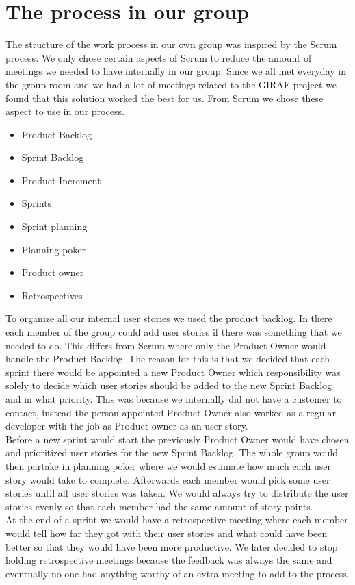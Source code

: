\section{The process in our group}

The structure of the work process in our own group was inspired by the Scrum process.
We only chose certain aspects of Scrum to reduce the amount of meetings we needed to have internally in our group. 
Since we all met everyday in the group room and we had a lot of meetings related to the GIRAF project we found that this solution worked the best for us.
From Scrum we chose these aspect to use in our process.

 \begin{itemize}
    \item Product Backlog
    \item Sprint Backlog
    \item Product Increment
    \item Sprints
    \item Sprint planning
    \item Planning poker
    \item Product owner
    \item Retrospectives
 \end{itemize}

 To organize all our internal user stories we used the product backlog.
 In there each member of the group could add user stories if there was something that we needed to do.
 This differs from Scrum where only the Product Owner would handle the Product Backlog.
 The reason for this is that we decided that each sprint there would be appointed a new Product Owner which responsibility was solely to decide which user stories should be added to the new Sprint Backlog and in what priority.
 This was because we internally did not have a customer to contact, instead the person appointed Product Owner also worked as a regular developer with the job as Product owner as an user story.
 \\
 Before a new sprint would start the previously Product Owner would have chosen and prioritized user stories for the new Sprint Backlog.
 The whole group would then partake in planning poker where we would estimate how much each user story would take to complete.
 Afterwards each member would pick some user stories until all user stories was taken.
 We would always try to distribute the user stories evenly so that each member had the same amount of story points.
 \\
 At the end of a sprint we would have a retrospective meeting where each member would tell how far they got with their user stories and what could have been better so that they would have been more productive.
 We later decided to stop holding retrospective meetings because the feedback was always the same and eventually no one had anything worthy of an extra meeting to add to the process.


